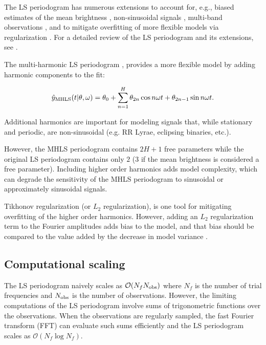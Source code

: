 \documentclass[apj]{emulateapj}
\newcommand{\bigO}{\mathcal{O}}
\begin{document}
The LS periodogram has numerous extensions to account for, e.g., biased estimates of the mean brightness
\citep{Zechmeister+Kurster_2009}, non-sinusoidal signals \citep{Schwarzenberg-Czerny_1996,Palmer_2009},
multi-band observations \citep{Vanderplas+Ivezic_2015}, and to mitigate overfitting of more
flexible models via regularization \citep{Vanderplas+Ivezic_2015}. For a detailed review
of the LS periodogram and its extensions, see \cite{Vanderplas_2018}.

The multi-harmonic LS periodogram \citep[][MHGLS]{Bretthorst+Chi-Cheng_1988,Schwarzenberg-Czerny_1996,Palmer_2009}, provides a more
flexible model by adding harmonic components to the fit:

\begin{equation}
    \hat{y}_{\rm MHLS}(t|\theta, \omega) = \theta_0 + \sum_{n=1}^H \theta_{2n}\cos{n\omega t} + \theta_{2n-1}\sin{n\omega t}.
\end{equation}

Additional harmonics are important for modeling signals that, while stationary and periodic,
are non-sinusoidal (e.g. RR Lyrae, eclipsing binaries, etc.).

However, the MHLS periodogram contains $2H+1$ free parameters while the original LS periodogram
contains only $2$ ($3$ if the mean brightness is considered a free parameter). Including higher order
harmonics adds model complexity, which can degrade the sensitivity of the MHLS periodogram to
sinusoidal or approximately sinusoidal signals.

Tikhonov regularization (or $L_2$ regularization), is one tool for mitigating overfitting
of the higher order harmonics. However, adding an $L_2$ regularization term to the Fourier amplitudes
adds bias to the model, and that bias should be compared to the value added by the
decrease in model variance \citep{Vanderplas+Ivezic_2015}.

\subsection{Computational scaling}

The LS periodogram naively scales as $\bigO(N_f N_{\rm obs})$ where $N_f$ is the number of trial
frequencies and $N_{\rm obs}$ is the number of observations. However, the limiting computations
of the LS periodogram involve sums of trigonometric functions over the observations. When
the observations are regularly sampled, the fast Fourier transform (FFT)  \citep{Cooley+Tukey_1965}
can evaluate such sums efficiently and the LS periodogram scales as $\bigO(N_f\log N_f)$.
\end{document}

